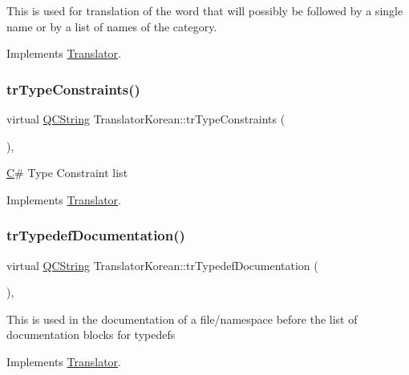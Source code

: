 This is used for translation of the word that will possibly be followed by a single name or by a list of names of the category. 

Implements \mbox{\hyperlink{class_translator}{Translator}}.

\mbox{\label{class_translator_korean_a40330c41363d6d093241961165b9da30}} 
\subsubsection{\texorpdfstring{trTypeConstraints()}{trTypeConstraints()}}
{\footnotesize\ttfamily virtual \mbox{\hyperlink{class_q_c_string}{Q\+C\+String}} Translator\+Korean\+::tr\+Type\+Constraints (\begin{DoxyParamCaption}{ }\end{DoxyParamCaption})\hspace{0.3cm}{\ttfamily [inline]}, {\ttfamily [virtual]}}

\mbox{\hyperlink{class_c}{C}}\# Type Constraint list 

Implements \mbox{\hyperlink{class_translator}{Translator}}.

\mbox{\label{class_translator_korean_a48b0c41bbc23a9ebe4b2b6635683096d}} 
\subsubsection{\texorpdfstring{trTypedefDocumentation()}{trTypedefDocumentation()}}
{\footnotesize\ttfamily virtual \mbox{\hyperlink{class_q_c_string}{Q\+C\+String}} Translator\+Korean\+::tr\+Typedef\+Documentation (\begin{DoxyParamCaption}{ }\end{DoxyParamCaption})\hspace{0.3cm}{\ttfamily [inline]}, {\ttfamily [virtual]}}

This is used in the documentation of a file/namespace before the list of documentation blocks for typedefs 

Implements \mbox{\hyperlink{class_translator}{Translator}}.

